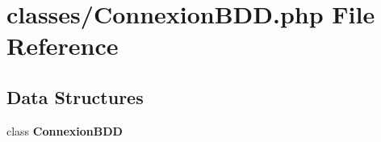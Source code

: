 \section{classes/\+Connexion\+B\+DD.php File Reference}
\label{_connexion_b_d_d_8php}
\subsection*{Data Structures}
\begin{DoxyCompactItemize}
\item 
class \textbf{ Connexion\+B\+DD}
\end{DoxyCompactItemize}
